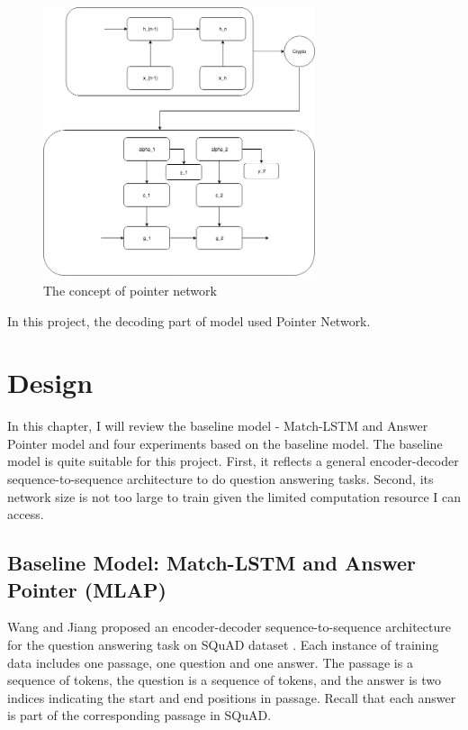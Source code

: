 \documentclass[modernstyle,12pt]{sjsuthesis}
\theoremstyle{definition}
\begin{document}
\begin{figure}[htbp]\centering
  \includegraphics[width=8cm, height=8cm]{figures/pointerNetwork.png}
  \caption{The concept of pointer network}
  \label{f:pointerNetwork}
\end{figure}

In this project, the decoding part of model used Pointer Network.


\chapter{Design}\label{chap:design}

In this chapter, I will review the baseline model - Match-LSTM and Answer Pointer model and four experiments based on the baseline model. The baseline model is quite suitable for this project. First, it reflects a general encoder-decoder sequence-to-sequence architecture to do question answering tasks. Second, its network size is not too large to train given the limited computation resource I can access.


\section{Baseline Model: Match-LSTM and Answer Pointer (MLAP) }

Wang and Jiang  proposed an encoder-decoder sequence-to-sequence architecture for the question answering task on SQuAD dataset \cite{wang2016machine}. Each instance of training data includes one passage, one question and one answer. The passage is a sequence of tokens, the question is a sequence of tokens, and the answer is two indices indicating the start and end positions in passage. Recall that each answer is part of the corresponding passage in SQuAD.
\end{document}
